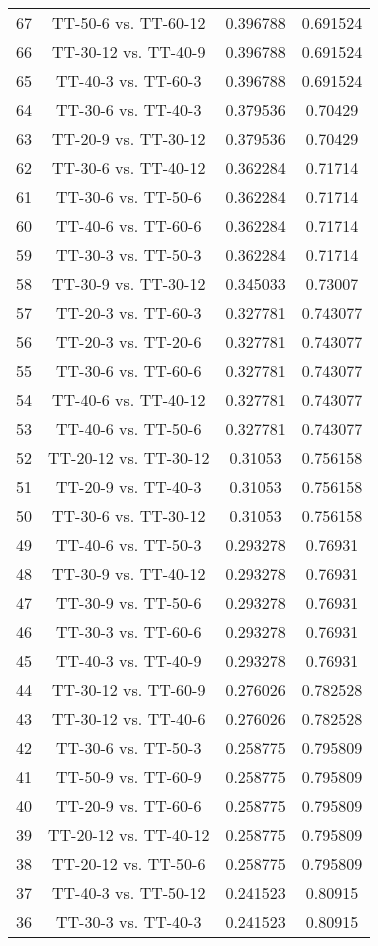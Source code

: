 \documentclass[a4paper,10pt]{article}
\begin{document}
\begin{landscape}
\begin{table}[!htp]
\begin{tabular}{cccc}
67&TT-50-6 vs. TT-60-12&0.396788&0.691524\\
66&TT-30-12 vs. TT-40-9&0.396788&0.691524\\
65&TT-40-3 vs. TT-60-3&0.396788&0.691524\\
64&TT-30-6 vs. TT-40-3&0.379536&0.70429\\
63&TT-20-9 vs. TT-30-12&0.379536&0.70429\\
62&TT-30-6 vs. TT-40-12&0.362284&0.71714\\
61&TT-30-6 vs. TT-50-6&0.362284&0.71714\\
60&TT-40-6 vs. TT-60-6&0.362284&0.71714\\
59&TT-30-3 vs. TT-50-3&0.362284&0.71714\\
58&TT-30-9 vs. TT-30-12&0.345033&0.73007\\
57&TT-20-3 vs. TT-60-3&0.327781&0.743077\\
56&TT-20-3 vs. TT-20-6&0.327781&0.743077\\
55&TT-30-6 vs. TT-60-6&0.327781&0.743077\\
54&TT-40-6 vs. TT-40-12&0.327781&0.743077\\
53&TT-40-6 vs. TT-50-6&0.327781&0.743077\\
52&TT-20-12 vs. TT-30-12&0.31053&0.756158\\
51&TT-20-9 vs. TT-40-3&0.31053&0.756158\\
50&TT-30-6 vs. TT-30-12&0.31053&0.756158\\
49&TT-40-6 vs. TT-50-3&0.293278&0.76931\\
48&TT-30-9 vs. TT-40-12&0.293278&0.76931\\
47&TT-30-9 vs. TT-50-6&0.293278&0.76931\\
46&TT-30-3 vs. TT-60-6&0.293278&0.76931\\
45&TT-40-3 vs. TT-40-9&0.293278&0.76931\\
44&TT-30-12 vs. TT-60-9&0.276026&0.782528\\
43&TT-30-12 vs. TT-40-6&0.276026&0.782528\\
42&TT-30-6 vs. TT-50-3&0.258775&0.795809\\
41&TT-50-9 vs. TT-60-9&0.258775&0.795809\\
40&TT-20-9 vs. TT-60-6&0.258775&0.795809\\
39&TT-20-12 vs. TT-40-12&0.258775&0.795809\\
38&TT-20-12 vs. TT-50-6&0.258775&0.795809\\
37&TT-40-3 vs. TT-50-12&0.241523&0.80915\\
36&TT-30-3 vs. TT-40-3&0.241523&0.80915\\

\end{tabular}
\end{table}
\end{landscape}
\end{document}
